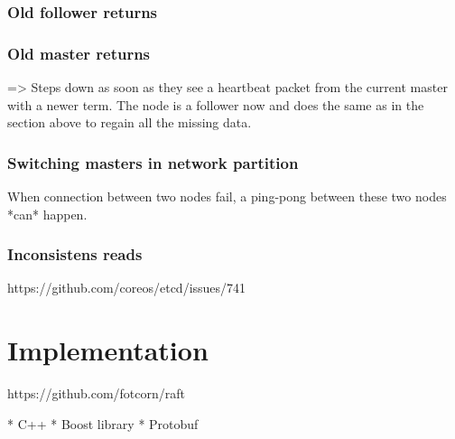 \subsubsection{Old follower returns}


\subsubsection{Old master returns}
=> Steps down as soon as they see a heartbeat packet from the current master with a newer term.
The node is a follower now and does the same as in the section above to regain all the missing data.

\subsubsection{Switching masters in network partition}
When connection between two nodes fail, a ping-pong between these two nodes *can* happen.

\subsubsection{Inconsistens reads}
https://github.com/coreos/etcd/issues/741

\section {Implementation}

https://github.com/fotcorn/raft

* C++
* Boost library
* Protobuf


